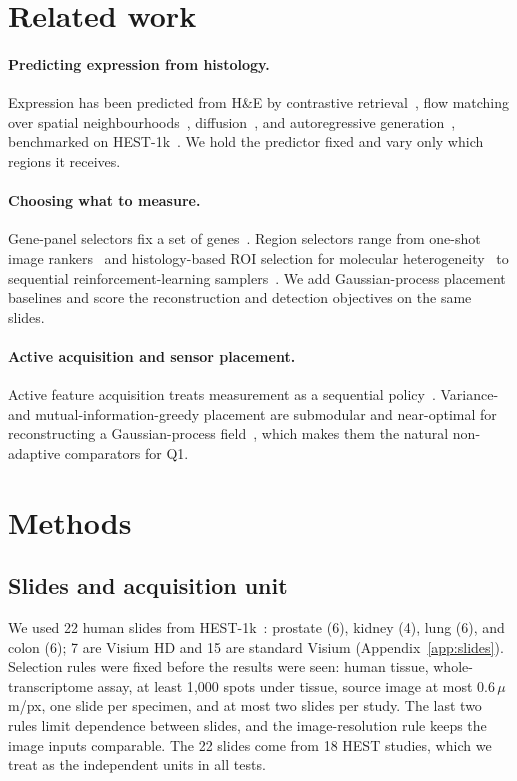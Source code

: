 \documentclass{article}
\begin{document}
\section{Related work}

\paragraph{Predicting expression from histology.}
Expression has been predicted from H\&E by contrastive retrieval~\citep{xie2023bleep}, flow matching over
spatial neighbourhoods~\citep{huang2025stflow}, diffusion~\citep{zhu2025stem}, and autoregressive
generation~\citep{genar2025}, benchmarked on HEST-1k~\citep{jaume2024hest}. We hold the predictor fixed and
vary only which regions it receives.

\paragraph{Choosing what to measure.}
Gene-panel selectors fix a set of genes~\citep{covert2023persist,reconst2026}. Region selectors range from
one-shot image rankers~\citep{spatialfinder2026} and histology-based ROI selection for molecular
heterogeneity~\citep{yuan2025s2omics} to sequential reinforcement-learning samplers~\citep{li2026sofisher,zhu2025scr2st}.
We add Gaussian-process placement baselines and score the reconstruction and detection objectives on the
same slides.

\paragraph{Active acquisition and sensor placement.}
Active feature acquisition treats measurement as a sequential policy~\citep{yin2020afa}. Variance- and
mutual-information-greedy placement are submodular and near-optimal for reconstructing a Gaussian-process
field~\citep{krause2008near}, which makes them the natural non-adaptive comparators for Q1.

\section{Methods}
\label{sec:setup}

\subsection{Slides and acquisition unit}
We used 22 human slides from HEST-1k~\citep{jaume2024hest}: prostate (6), kidney (4), lung (6), and colon (6);
7 are Visium HD and 15 are standard Visium (Appendix~\ref{app:slides}). Selection rules were fixed before the
results were seen: human tissue, whole-transcriptome assay, at least 1{,}000 spots under tissue, source image
at most 0.6\,$\mu$m/px, one slide per specimen, and at most two slides per study. The last two rules limit
dependence between slides, and the image-resolution rule keeps the image inputs comparable. The 22 slides
come from 18 HEST studies, which we treat as the independent units in all tests.
\end{document}
